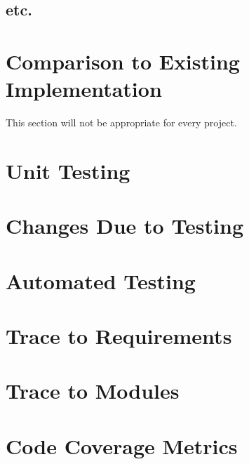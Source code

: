 \documentclass[12pt, titlepage]{article}
\begin{document}
\subsection{etc.}
	
\section{Comparison to Existing Implementation}	

This section will not be appropriate for every project.

\section{Unit Testing}

\section{Changes Due to Testing}

\section{Automated Testing}
		
\section{Trace to Requirements}
		
\section{Trace to Modules}		

\section{Code Coverage Metrics}




\end{document}
